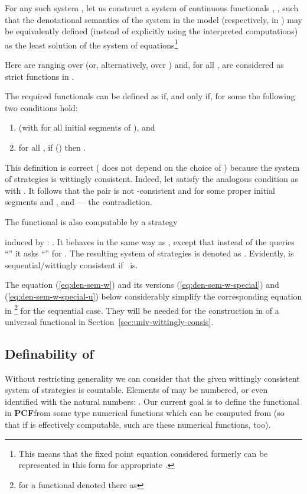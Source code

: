\documentclass[fleqn]{LMCS}
\theoremstyle{plain}\newtheorem{satz}[thm]{Satz}
\theoremstyle{plain}\newtheorem{hyp}[thm]{Hypothesis}
\theoremstyle{plain}\newtheorem{hyps}[thm]{Hypotheses}
\theoremstyle{definition}\newtheorem{note}[thm]{Note}
\newcommand{\PCF}{\mbox{\bf PCF}}
\newcommand{\?}{\mbox{?}}
\begin{document}
For any such system , let us construct  
a system of  
continuous functionals 
, ,  
such that the denotational 
semantics  of the system  
in the model  (respectively, in ) 
may be equivalently defined 
(instead of explicitly using the interpreted computations) 
as the least solution of the system of equations\footnote{This means that the fixed point equation 
 considered formerly 
can be represented in this form for appropriate . 
}

Here  are ranging over  
(or, alternatively, over ) 
and, for all ,  are considered 
as strict functions in . 

The required functionals  can be defined as 
 if, and only if, for some 
 the following two conditions hold:
\begin{enumerate}[(1)]
\item 
 (with  for all initial segments 
 of ), and 
\item
for all , 
if  () then .
\end{enumerate}
This definition is correct ( does not depend on the choice of 
) because the system of strategies  is 
wittingly consistent. 
Indeed, let  satisfy the analogous condition 
as  with . It follows that 
the pair  is not -consistent and for some proper 
initial segments  and ,  
 and 
 --- the contradiction.

The functional  is also computable by a strategy 
 
\linebreak
induced by : . 
It behaves in the same way as , except that 
instead of the queries 
``'' it asks ``'' for . 
The resulting system of 
strategies is denoted as . 
Evidently,  is sequential/wittingly 
consistent if ~is. 

The equation (\ref{eq:den-sem-w}) and its versions 
(\ref{eq:den-sem-w-special}) and (\ref{eq:den-sem-w-special-u}) below 
considerably simplify the corresponding equation in \cite{Saz76AL}\footnote{for a functional denoted there as 
} 
for the sequential case.
They will be needed for the construction in  of a universal 
functional  in Section~\ref{sec:univ-wittingly-consis}.  

\subsection{Definability of \texorpdfstring{}{G-M-m(f)}}
\label{sec:def-of-F}

\noindent
Without restricting generality we can consider that 
the given wittingly consistent 
system of strategies  
is countable. 
Elements of  may be numbered, or even identified with 
the natural numbers: . Our current goal is to define 
the functional 
 in \PCF from some type 
 numerical functions 
which can be computed from  (so that if  
is effectively computable, such are these numerical 
functions, too). 
\end{document}

